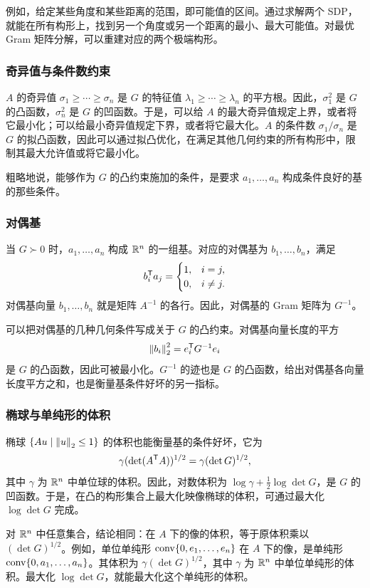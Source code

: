 例如，给定某些角度和某些距离的范围，即可能值的区间。通过求解两个 SDP，就能在所有构形上，找到另一个角度或另一个距离的最小、最大可能值。对最优 Gram 矩阵分解，可以重建对应的两个极端构形。
\subsubsection*{奇异值与条件数约束}
$A$ 的奇异值 $\sigma_1\geq\cdots\geq\sigma_n$ 是 $G$ 的特征值 $\lambda_1\geq\cdots\geq\lambda_n$ 的平方根。因此，$\sigma_1^2$ 是 $G$ 的凸函数，$\sigma_n^2$ 是 $G$ 的凹函数。于是，可以给 $A$ 的最大奇异值规定上界，或者将它最小化；可以给最小奇异值规定下界，或者将它最大化。$A$ 的条件数 $\sigma_1/\sigma_n$ 是 $G$ 的拟凸函数，因此可以通过拟凸优化，在满足其他几何约束的所有构形中，限制其最大允许值或将它最小化。

粗略地说，能够作为 $G$ 的凸约束施加的条件，是要求 $a_1,\ldots,a_n$ 构成条件良好的基的那些条件。
\subsubsection*{对偶基}
当 $G\succ0$ 时，$a_1,\ldots,a_n$ 构成 $\mathbb R^n$ 的一组基。对应的对偶基为 $b_1,\ldots,b_n$，满足
\[b_i^\mathsf T a_j=\begin{cases}1,&i=j,\\0,&i\ne j.\end{cases}\]
对偶基向量 $b_1,\ldots,b_n$ 就是矩阵 $A^{-1}$ 的各行。因此，对偶基的 Gram 矩阵为 $G^{-1}$。

可以把对偶基的几种几何条件写成关于 $G$ 的凸约束。对偶基向量长度的平方
\[\left\lVert b_i\right\rVert_2^2=e_i^\mathsf T G^{-1}e_i\]
是 $G$ 的凸函数，因此可被最小化。$G^{-1}$ 的迹也是 $G$ 的凸函数，给出对偶基各向量长度平方之和，也是衡量基条件好坏的另一指标。
\subsubsection*{椭球与单纯形的体积}
椭球 $\{Au\mid\left\lVert u\right\rVert_2\leq1\}$ 的体积也能衡量基的条件好坏，它为
\[\gamma(\det(A^\mathsf T A))^{1/2}=\gamma(\det G)^{1/2},\]
其中 $\gamma$ 为 $\mathbb R^n$ 中单位球的体积。因此，对数体积为 $\log\gamma+\tfrac12\log\det G$，是 $G$ 的凹函数。于是，在凸的构形集合上最大化映像椭球的体积，可通过最大化 $\log\det G$ 完成。

对 $\mathbb R^n$ 中任意集合，结论相同：在 $A$ 下的像的体积，等于原体积乘以 $(\det G)^{1/2}$。例如，单位单纯形 $\operatorname{conv}\{0,e_1,\ldots,e_n\}$ 在 $A$ 下的像，是单纯形 $\operatorname{conv}\{0,a_1,\ldots,a_n\}$。其体积为 $\gamma(\det G)^{1/2}$，其中 $\gamma$ 为 $\mathbb R^n$ 中单位单纯形的体积。最大化 $\log\det G$，就能最大化这个单纯形的体积。

